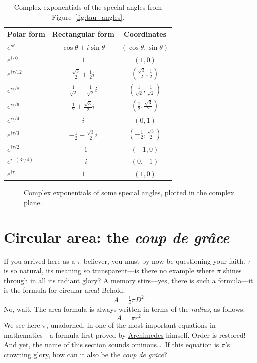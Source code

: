\begin{table}
\begin{center}
\begin{tabular}{lcc}
Polar form & Rectangular form & Coordinates \\ \hline\hline
$e^{i\theta}$ & $\cos\theta + i\sin\theta$ & $(\cos\theta, \sin\theta)$ \\ \hline
$e^{i\cdot0}$ & $1$ & $(1, 0)$ \smallskip \\
$e^{i\tau/12}$ & $\frac{\sqrt{3}}{2} + \frac{1}{2}i$ & $(\frac{\sqrt{3}}{2}, \frac{1}{2})$ \smallskip \\
$e^{i\tau/8}$ & $\frac{1}{\sqrt{2}} +  \frac{1}{\sqrt{2}}i$ & $(\frac{1}{\sqrt{2}}, \frac{1}{\sqrt{2}})$ \smallskip \\
$e^{i\tau/6}$ & $\frac{1}{2} +\frac{\sqrt{3}}{2} i$ & $(\frac{1}{2}, \frac{\sqrt{3}}{2})$ \smallskip \\
$e^{i\tau/4}$ & $i$ & $(0, 1)$ \smallskip \\
$e^{i\tau/3}$ & $-\frac{1}{2} +\frac{\sqrt{3}}{2} i$ & $(-\frac{1}{2}, \frac{\sqrt{3}}{2})$ \smallskip \\
$e^{i\tau/2}$ & $-1$ & $(-1, 0)$ \smallskip \\
$e^{i\cdot(3\tau/4)}$ & $-i$ & $(0, -1)$ \smallskip \\
$e^{i\tau}$ & $1$ & $(1, 0)$
\end{tabular}
\end{center}
\caption{Complex exponentials of the special angles from Figure~\ref{fig:tau_angles}.\label{table:complex_exponentials}}
\end{table}

\begin{figure}
\begin{center}
\end{center}
\caption{Complex exponentials of some special angles, plotted in the complex plane.\label{fig:tau_euler_circle}}
\end{figure}


\section{Circular area: the \emph{coup de gr\^{a}ce}} %
\label{sec:circular_area}

If you arrived here as a $\pi$ believer, you must by now be questioning your faith. $\tau$ is so natural, its meaning so transparent---is there no example where $\pi$ shines through in all its radiant glory? A memory stirs---yes, there is such a formula---it is the formula for circular area! Behold:
\[ A = \tfrac{1}{4} \pi D^2. \]
No, wait. The area formula is always written in terms of the \emph{radius}, as follows:
\[ A = \pi r^2. \]
We see here $\pi$, unadorned, in one of the most important equations in mathe\-matics---a formula first proved by \href{https://en.wikipedia.org/wiki/Archimedes}{Archimedes} himself. Order is restored! And yet, the name of this section sounds ominous\ldots\ If this equation is $\pi$'s crowning glory, how can it also be the \href{https://en.wikipedia.org/wiki/Coup_de_grace}{\emph{coup de gr\^{a}ce}}?


